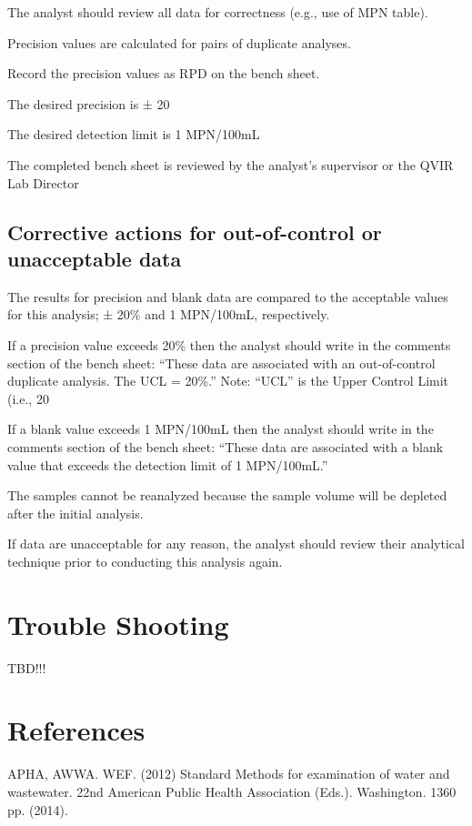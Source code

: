 \documentclass[12pt]{../SOP4_alpha}\usepackage[]{graphicx}\usepackage[]{color}
\begin{document}
\NP The analyst should review all data for correctness (e.g., use of MPN table).

\NP Precision values are calculated for pairs of duplicate analyses.

\NP Record the precision values as RPD on the bench sheet.

\NP The desired precision is ± 20%

\NP The desired detection limit is 1 MPN/100mL

\NP The completed bench sheet is reviewed by the analyst's supervisor or the
QVIR Lab Director 


\subsection{Corrective actions for out-of-control or unacceptable data}

\NP The results for precision and blank data are compared to the
acceptable values for this analysis; ± 20\% and 1 MPN/100mL,
respectively.

\NP If a precision value exceeds 20\% then the analyst should write in the
comments section of the bench sheet: “These data are associated
with an out-of-control duplicate analysis. The UCL = 20\%.” Note:
“UCL” is the Upper Control Limit (i.e., 20%

\NP If a blank value exceeds 1 MPN/100mL then the analyst should write
in the comments section of the bench sheet: “These data are
associated with a blank value that exceeds the detection limit of 1
MPN/100mL.”

\NP The samples cannot be reanalyzed because the sample volume will be
depleted after the initial analysis.

\NP  If data are unacceptable for any reason, the analyst should review
their analytical technique prior to conducting this analysis again. 

\section{Trouble Shooting}

TBD!!! 


\section{References}

\NP APHA, AWWA. WEF. (2012) Standard Methods for examination of water and wastewater. 22nd American Public Health Association (Eds.). Washington. 1360 pp. (2014).
\end{document}
